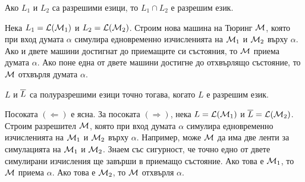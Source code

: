 \begin{proposition}
  Ако $L_1$ и $L_2$ са разрешими езици, то $L_1 \cap L_2$ е разрешим език.
\end{proposition}
\begin{hint}
  Нека $L_1 = \mathcal{L}(\mathcal{M}_1)$ и $L_2 = \mathcal{L}(\mathcal{M}_2)$.
  Строим нова машина на Тюринг $\mathcal{M}$, която при вход думата $\alpha$
  симулира едновременно изчисленията на $\mathcal{M}_1$ и $\mathcal{M}_2$ върху $\alpha$.
  Ако и двете машини достигнат до приемащите си състояния, то $\mathcal{M}$ приема думата $\alpha$.
  Ако поне една от двете машини достигне до отхвърлящо състояние, то $\mathcal{M}$ отхвърля думата $\alpha$.
\end{hint}




\begin{important}
  \begin{theorem}
    $L$ и $\overline{L}$ са полуразрешими езици точно тогава, когато $L$ е разрешим език.
  \end{theorem}
\end{important}
\begin{hint}
  Посоката $(\Leftarrow)$ е ясна.
  За посоката $(\Rightarrow)$, нека $L = \mathcal{L}(\mathcal{M}_1)$ и $\overline{L} = \mathcal{L}(\mathcal{M}_2)$.
  Строим разрешител $\mathcal{M}$, която при вход думата $\alpha$ симулира едновременно изчисленията на $\mathcal{M}_1$ и $\mathcal{M}_2$ върху $\alpha$.
  Например, може $\mathcal{M}$ да има две ленти за симулацията на $\mathcal{M}_1$ и $\mathcal{M}_2$.
  Знаем със сигурност, че точно едно от двете симулирани изчисления ще завърши в приемащо състояние.
  Ако това е $\mathcal{M}_1$, то $\mathcal{M}$ приема $\alpha$.
  Ако това е $\mathcal{M}_2$, то $\mathcal{M}$ отхвърля $\alpha$.
\end{hint}



